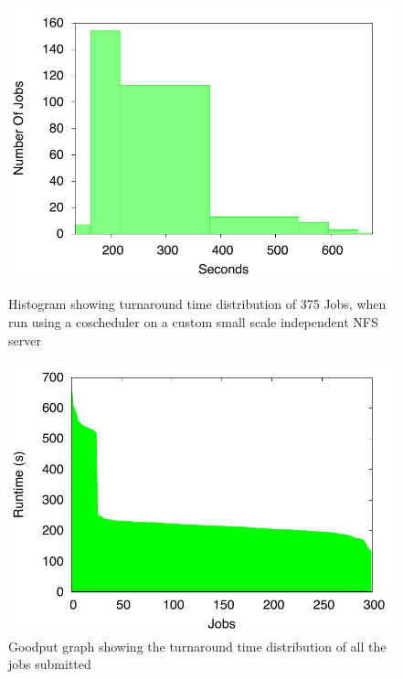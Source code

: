\documentclass[ms,electronic,double]{nuthesis}
\begin{document}
\begin{figure}[htbp!]
\begin{center}
\includegraphics{images/nfs_coscheduler_tusker_histogram}
\caption{Histogram showing turnaround time distribution of 375 Jobs, when run using a coscheduler on a custom small scale independent NFS server}
\label{fig:nfs_coscheduler_tusker_histogram}
\end{center}

\begin{center}
\includegraphics{images/nfs_coscheduler_tusker_goodput}
\caption{Goodput graph showing the turnaround time distribution of all the jobs submitted}
\label{fig:nfs_coscheduler_tusker_goodput}
\end{center}


\end{figure}
\FloatBarrier
\end{document}
